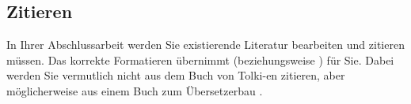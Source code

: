 \documentclass[11pt,a4paper]{article}
\begin{document}
\subsection{Zitieren}
In Ihrer Abschlussarbeit werden Sie existierende Literatur bearbeiten und zitieren müssen. Das korrekte Formatieren übernimmt  (beziehungsweise ) für Sie. Dabei werden Sie vermutlich nicht aus dem Buch von Tolki-\linebreak en \cite{HdR1954} zitieren, aber möglicherweise aus einem Buch zum Übersetzerbau \cite{compilers2006}.



\end{document}
